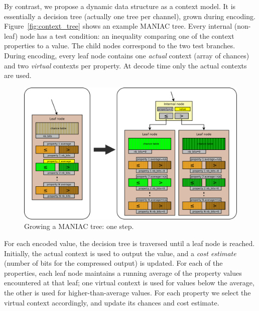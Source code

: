 \documentclass{article}
\begin{document}
By contrast, we propose a dynamic data structure as a context model. It is essentially
a decision tree (actually one tree per channel), grown during encoding.
Figure~\ref{fig:context_tree} shows an example MANIAC tree.
%
Every internal (non-leaf) node has a test condition: an inequality comparing one of the context properties
to a value. The child nodes correspond to the two test branches.
During encoding, every leaf node contains one {\it actual} context (array of chances)
and two {\it virtual} contexts per property. %
At decode time only the actual contexts are used.

\begin{figure}
\includegraphics[width=\linewidth]{images/context_split}
\caption{Growing a MANIAC tree: one step.}
\label{fig:context_tree_split}
\end{figure}


For each encoded value, the decision tree is traversed until a leaf node is reached.
Initially, the actual context is used to output the value, and a {\it cost estimate} (number of bits for the compressed output) is updated.
For each of the properties, each leaf node maintains a running average of the property values encountered at that leaf;
one virtual context is used for values below the average, the other is used for higher-than-average values.
For each property we select the virtual context accordingly, and update its chances and cost estimate.
\end{document}
